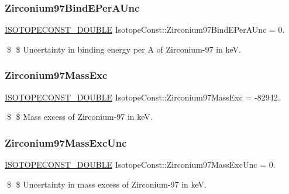 \subsubsection{\texorpdfstring{Zirconium97\+Bind\+E\+Per\+A\+Unc}{Zirconium97BindEPerAUnc}}
{\footnotesize\ttfamily \mbox{\hyperlink{group___isotope_const-_macros_ga8f45a7272ce02c0b4c65c44636ed719a}{I\+S\+O\+T\+O\+P\+E\+C\+O\+N\+S\+T\+\_\+\+D\+O\+U\+B\+LE}} Isotope\+Const\+::\+Zirconium97\+Bind\+E\+Per\+A\+Unc = 0.}

\$ \$ Uncertainty in binding energy per A of Zirconium-\/97 in keV. \mbox{\label{group___isotope_const-_zirconium-_zr97_ga675d88646a4971a68c91e6aed35cea1d}} 
\subsubsection{\texorpdfstring{Zirconium97\+Mass\+Exc}{Zirconium97MassExc}}
{\footnotesize\ttfamily \mbox{\hyperlink{group___isotope_const-_macros_ga8f45a7272ce02c0b4c65c44636ed719a}{I\+S\+O\+T\+O\+P\+E\+C\+O\+N\+S\+T\+\_\+\+D\+O\+U\+B\+LE}} Isotope\+Const\+::\+Zirconium97\+Mass\+Exc = -\/82942.}

\$ \$ Mass excess of Zirconium-\/97 in keV. \mbox{\label{group___isotope_const-_zirconium-_zr97_ga919591194a68d86b9fdaf004ef0e08b3}} 
\subsubsection{\texorpdfstring{Zirconium97\+Mass\+Exc\+Unc}{Zirconium97MassExcUnc}}
{\footnotesize\ttfamily \mbox{\hyperlink{group___isotope_const-_macros_ga8f45a7272ce02c0b4c65c44636ed719a}{I\+S\+O\+T\+O\+P\+E\+C\+O\+N\+S\+T\+\_\+\+D\+O\+U\+B\+LE}} Isotope\+Const\+::\+Zirconium97\+Mass\+Exc\+Unc = 0.}

\$ \$ Uncertainty in mass excess of Zirconium-\/97 in keV. \mbox{\label{group___isotope_const-_zirconium-_zr97_ga55ec069ea28eb5d3622a3d330e337ae0}} 
